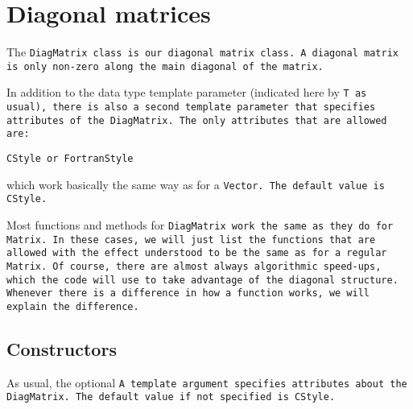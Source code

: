 
\section{Diagonal matrices}
\label{DiagMatrix}

The \tt{DiagMatrix} class is our diagonal matrix class.  
A diagonal matrix is only non-zero
along the main diagonal of the matrix.  

In addition to the data type template parameter (indicated here by \tt{T} as usual),
there is also a second template parameter that specifies attributes of the
\tt{DiagMatrix}.  The only attributes that are allowed are:
\begin{description} \itemsep -2pt
\item[$\bullet$] \tt{CStyle} or \tt{FortranStyle}
\end{description}
which work basically the same way as for a \tt{Vector}.
The default value is \tt{CStyle}.

Most functions and methods for \tt{DiagMatrix} work the same
as they do for \tt{Matrix}.
In these cases, we will just list the functions
that are allowed with the
effect understood to be the same as for a regular \tt{Matrix}.  Of course, there are 
almost always algorithmic speed-ups, which the code will use to take advantage of the 
diagonal structure.
Whenever there is a difference in how a function works,
we will explain the difference.

\subsection{Constructors}
\label{DiagMatrix_Constructors}

As usual, the optional \tt{A} template argument specifies attributes about
the \tt{DiagMatrix}.  The default value if not specified is \tt{CStyle}.

